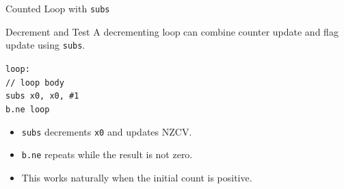 \documentclass[aspectratio=169,11pt,t]{beamer}
\newcommand{\code}[1]{\texttt{#1}}
\begin{document}
\begin{frame}{Counted Loop with \code{subs}}
\begin{block}{Decrement and Test}
A decrementing loop can combine counter update and flag update using \code{subs}.
\end{block}
\vspace{0.25cm}
\large
\hspace{3.6cm}\code{loop:}\\[0.12cm]
\hspace{4.1cm}\code{// loop body}\\[0.12cm]
\hspace{4.1cm}\code{subs x0, x0, \#1}\\[0.12cm]
\hspace{4.1cm}\code{b.ne loop}
\normalsize
\vspace{0.25cm}
\begin{itemize}
\item \code{subs} decrements \code{x0} and updates NZCV.
\item \code{b.ne} repeats while the result is not zero.
\item This works naturally when the initial count is positive.
\end{itemize}
\end{frame}



\end{document}
